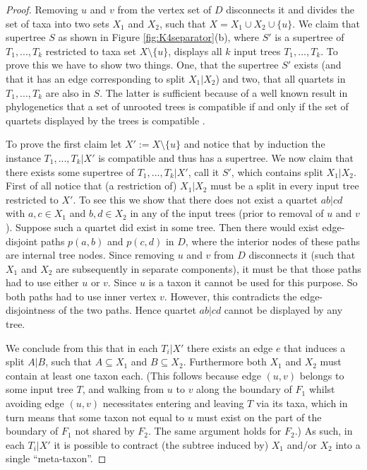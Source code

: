 \begin{proof}
Removing $u$ and $v$ from the vertex set of $D$ disconnects it and divides the set of taxa into two sets $X_1$ and $X_2$, such that $X =  X_1 \cup X_2 \cup \{u\}$. We claim that supertree $S$ as shown in Figure \ref{fig:K4separator}(b), where $S'$ is a supertree of $T_1,...,T_k$ restricted to taxa set $X\setminus \{u\}$, displays all $k$ input trees $T_1,...,T_k$. To prove this we have to show two things. One, that the supertree $S'$ exists (and that it has an edge corresponding to split $X_1|X_2$) and two, that all quartets in $T_1,...,T_k$ are also in $S$. The latter is sufficient because of a well known result in phylogenetics that a set of unrooted trees is compatible if and only if the set of quartets displayed by the trees is compatible \cite{SemSte03}.

To prove the first claim let $X':=X\setminus \{u\}$ and notice that by induction the instance $T_1,...,T_k|X'$ is compatible and thus has a supertree. We now claim that there exists some supertree of $T_1,...,T_k|X'$, call it $S'$, which contains split $X_1|X_2$. First of all notice that (a restriction of) $X_1|X_2$ must  be a split in every input tree restricted to $X'$. To see this we show that there does not exist a quartet $ab|cd$ with $a,c \in X_1$ and $b,d \in X_2$ in any of the input trees (prior to removal of $u$ and $v$). Suppose such a quartet did exist in some tree.
 Then there would exist edge-disjoint paths $p(a,b)$ and $p(c,d)$ in $D$, where the interior nodes of these paths are internal tree nodes. Since removing $u$ and $v$ from $D$ disconnects it (such that $X_1$ and $X_2$ are subsequently in separate components), it must be that those paths had to use either $u$ or $v$. Since $u$ is a taxon it cannot be used for this purpose. So both paths had to use inner vertex $v$. However, this contradicts the edge-disjointness of the two paths. Hence quartet $ab|cd$ cannot be displayed by any tree.

We conclude from this that in each $T_i|X'$ there exists an edge $e$ that induces a split $A|B$, such that $A \subseteq X_1$ and $B \subseteq X_2$. Furthermore both $X_1$ and $X_2$ must contain at least one taxon each. (This follows because edge $(u,v)$ belongs to some input tree $T$, and walking from $u$ to $v$ along the boundary of $F_1$ whilst avoiding edge $(u,v)$ necessitates
entering and leaving $T$ via its taxa, which in turn means that some taxon not equal to $u$ must exist on the part of the boundary of $F_1$ not shared by $F_2$. The same argument holds for $F_2$.) As such, in each $T_i|X'$ it is possible to contract (the subtree induced by) $X_1$ and/or $X_2$ into a single ``meta-taxon''.


\end{proof}
